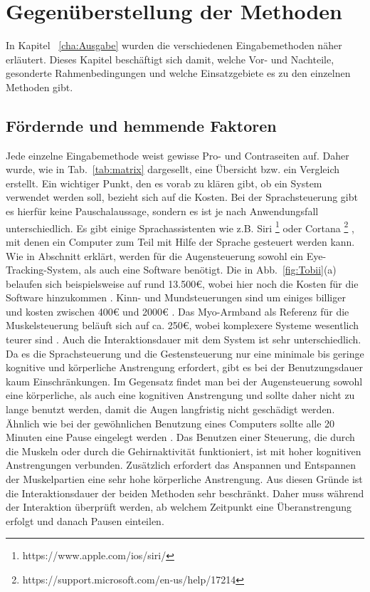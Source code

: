 \chapter{Gegenüberstellung der Methoden}
\label{cha:Vergleich}

In Kapitel ~\ref{cha:Ausgabe} wurden die verschiedenen Eingabemethoden näher erläutert. Dieses Kapitel beschäftigt sich damit, welche Vor- und Nachteile, gesonderte Rahmenbedingungen und welche Einsatzgebiete es zu den einzelnen Methoden gibt.

\section{Fördernde und hemmende Faktoren}
%
Jede einzelne Eingabemethode weist gewisse Pro- und Contraseiten auf. Daher wurde, wie in Tab.~\ref{tab:matrix} dargesellt, eine Übersicht bzw. ein Vergleich erstellt.
\newline \newline
Ein wichtiger Punkt, den es vorab zu klären gibt, ob ein System verwendet werden soll, bezieht sich auf die Kosten. Bei der Sprachsteuerung gibt es hierfür keine Pauschalaussage, sondern es ist je nach Anwendungsfall unterschiedlich. Es gibt einige Sprachassistenten wie z.B. Siri%
\footnote{https://www.apple.com/ios/siri/}
%
 oder Cortana%
\footnote{https://support.microsoft.com/en-us/help/17214}
%
 , mit denen ein Computer zum Teil mit Hilfe der Sprache gesteuert werden kann. Wie in Abschnitt \label{cha:Augensteuerung} erklärt, werden für die Augensteuerung sowohl ein Eye-Tracking-System, als auch eine Software benötigt. Die in Abb.~\ref{fig:Tobii}(a) belaufen sich beispielsweise auf rund 13.500€, wobei hier noch die Kosten für die Software hinzukommen \cite{TobiiCosts}. Kinn- und Mundsteuerungen sind um einiges billiger und kosten zwischen 400€ und 2000€ \cite{SENSORY} \cite{INTEGRA}. Das Myo-Armband als Referenz für die Muskelsteuerung beläuft sich auf ca. 250€, wobei komplexere Systeme wesentlich teurer sind \cite{myoBand}. 
\newline \newline
Auch die Interaktionsdauer mit dem System ist sehr unterschiedlich. Da es die Sprachsteuerung und die Gestensteuerung nur eine minimale bis geringe kognitive und körperliche Anstrengung erfordert, gibt es bei der Benutzungsdauer kaum Einschränkungen. Im Gegensatz findet man bei der Augensteuerung sowohl eine körperliche, als auch eine kognitiven Anstrengung und sollte daher nicht zu lange benutzt werden, damit die Augen langfristig nicht geschädigt werden. Ähnlich wie bei der gewöhnlichen Benutzung eines Computers sollte alle 20 Minuten eine Pause eingelegt werden \cite{20Methode}. Das Benutzen einer Steuerung, die durch die Muskeln oder durch die Gehirnaktivität funktioniert, ist mit hoher kognitiven Anstrengungen verbunden. Zusätzlich erfordert das Anspannen und Entspannen der Muskelpartien eine sehr hohe körperliche Anstrengung. Aus diesen Gründe ist die Interaktionsdauer der beiden Methoden sehr beschränkt. Daher muss während der Interaktion überprüft werden, ab welchem Zeitpunkt eine Überanstrengung erfolgt und danach Pausen einteilen.
